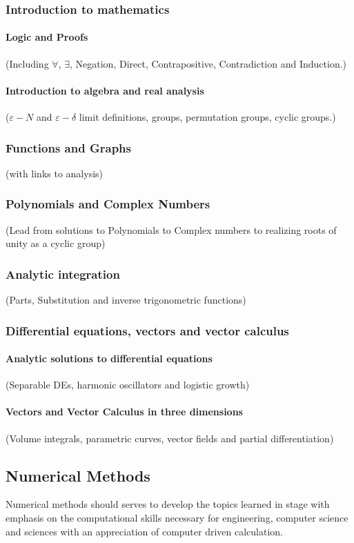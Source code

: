 \documentclass[12pt]{report}
\begin{document}
    \subsubsection{Introduction to mathematics}
        \paragraph*{Logic and Proofs} (Including $\forall$, $\exists$, Negation, Direct, Contrapositive, Contradiction and Induction.)
        \paragraph*{Introduction to algebra and real analysis} ($\varepsilon - N$ and $\varepsilon - \delta$ limit definitions, groups, permutation groups, cyclic groups.)
    \subsubsection{Functions and Graphs} (with links to analysis)
    \subsubsection{Polynomials and Complex Numbers} (Lead from solutions to Polynomials to Complex numbers to realizing roots of unity as a cyclic group)
    \subsubsection{Analytic integration} (Parts, Substitution and inverse trigonometric functions)
    \subsubsection{Differential equations, vectors and vector calculus}
        \paragraph*{Analytic solutions to differential equations} (Separable DEs, harmonic oscillators and logistic growth)
        \paragraph*{Vectors and Vector Calculus in three dimensions} (Volume integrals, parametric curves, vector fields and partial differentiation)



\subsection{Numerical Methods}
    Numerical methods should serves to develop the topics learned in stage with emphasis on the computational skills necessary for engineering, computer science and sciences with an appreciation of computer driven calculation.
\end{document}

